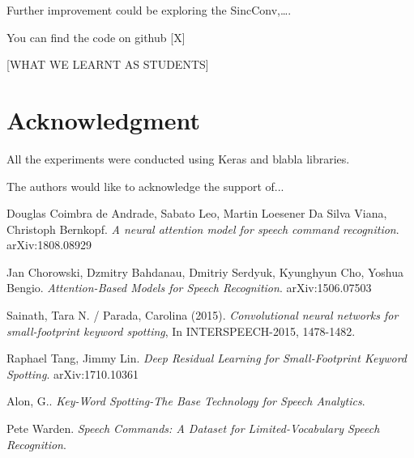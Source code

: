 \documentclass[conference]{IEEEtran}
\begin{document}
Further improvement could be exploring the SincConv,….

You can find the code on github [X]

[WHAT WE LEARNT AS STUDENTS]


\section*{Acknowledgment}
All the experiments were conducted using Keras and blabla libraries.

The authors would like to acknowledge the support of...


\begin{thebibliography}{1}
Douglas Coimbra de Andrade, Sabato Leo, Martin Loesener Da Silva Viana, Christoph Bernkopf. \textit{A neural attention model for speech command recognition}. arXiv:1808.08929

Jan Chorowski, Dzmitry Bahdanau, Dmitriy Serdyuk, Kyunghyun Cho, Yoshua Bengio. \textit{Attention-Based Models for Speech Recognition}. arXiv:1506.07503

Sainath, Tara N. / Parada, Carolina (2015). \textit{Convolutional neural networks for small-footprint keyword spotting}, In INTERSPEECH-2015, 1478-1482.

Raphael Tang, Jimmy Lin. \textit{Deep Residual Learning for Small-Footprint Keyword Spotting}. arXiv:1710.10361

Alon, G.. \textit{Key-Word Spotting-The Base Technology for Speech Analytics}.

Pete Warden. \textit{Speech Commands: A Dataset for Limited-Vocabulary Speech Recognition}.
\end{thebibliography}
\end{document}
